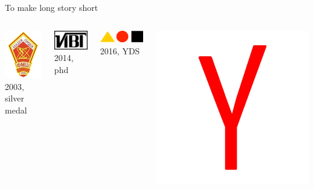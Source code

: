 \documentclass[fullscreen=true, bookmarks=true, hyperref={pdfencoding=unicode}]{beamer}
\begin{document}
\begin{frame}{To make long story short}
\begin{columns}
\begin{column}{.15\paperwidth}
      \includegraphics[keepaspectratio,       width=.15\paperwidth]{pms.png}
      2003, silver medal      
    \end{column}
    \begin{column}{.15\paperwidth}
      \vspace{3cm}
      \includegraphics[keepaspectratio,       width=.15\paperwidth]{ict.png}
      2014, phd
    \end{column}
    \begin{column}{.15\paperwidth}
      \vspace{1.5cm}
      \includegraphics[keepaspectratio,       width=.15\paperwidth]{shad.png}
      2016, YDS
    \end{column}
    \begin{column}{.15\paperwidth}
      \includegraphics[keepaspectratio,       width=.15\paperwidth]{yandex.jpg}

\end{column}
\end{columns}
\end{frame}
\end{document}
